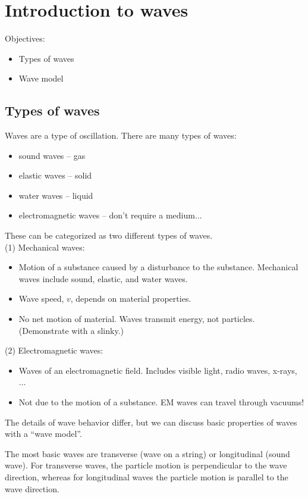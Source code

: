 \section{Introduction to waves}
Objectives:
\begin{itemize}
\item Types of waves
\item Wave model
\end{itemize}

\hrulefill

\subsection{Types of waves}
Waves are a type of oscillation. There are many types of waves:
\begin{itemize}
\item sound waves -- gas
\item elastic waves -- solid
\item water waves -- liquid
\item electromagnetic waves -- don't require a medium...
\end{itemize}

These can be categorized as two different types of waves.\\
(1) Mechanical waves:
\begin{itemize}
\item Motion of a substance caused by a disturbance to the substance. Mechanical waves include sound, elastic, and water waves.
\item Wave speed, $v$, depends on material properties.
\item No net motion of material. Waves transmit energy, not particles. (Demonstrate with a slinky.)
\end{itemize}

(2) Electromagnetic waves:
\begin{itemize}
\item Waves of an electromagnetic field. Includes visible light, radio waves, x-rays, ...
\item Not due to the motion of a substance. EM waves can travel through vacuums!
\end{itemize}

The details of wave behavior differ, but we can discuss basic properties of waves with a ``wave model''.

The most basic waves are transverse (wave on a string) or longitudinal (sound wave). For transverse waves, the particle motion is perpendicular to the wave direction, whereas for longitudinal waves the particle motion is parallel to the wave direction.

